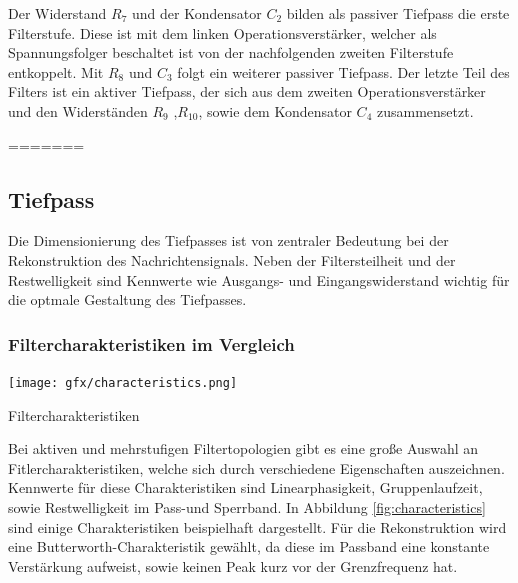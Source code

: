 \noindent
Der Widerstand $R_7$ und der Kondensator $C_2$ bilden als passiver Tiefpass die erste Filterstufe. Diese ist mit dem linken Operationsverstärker, welcher als Spannungsfolger beschaltet ist von der nachfolgenden zweiten Filterstufe entkoppelt. Mit $R_8$ und $C_3$ folgt ein weiterer passiver Tiefpass. Der letzte Teil des Filters ist ein aktiver Tiefpass, der sich aus dem zweiten Operationsverstärker und den Widerständen $R_9$ ,$R_{10}$, sowie dem Kondensator $C_4$ zusammensetzt.








=======
\newpage
\subsection{Tiefpass}
Die Dimensionierung des Tiefpasses ist von zentraler Bedeutung bei der Rekonstruktion des Nachrichtensignals. Neben der Filtersteilheit und der Restwelligkeit sind Kennwerte wie Ausgangs- und Eingangswiderstand wichtig für die optmale Gestaltung des Tiefpasses.
\subsubsection{Filtercharakteristiken im Vergleich} 
\begin{floatingfigure}[r]{7cm}
	\texttt{[image: gfx/characteristics.png]}
	\caption{Filtercharakteristiken}
\label{fig:characteristics}
\end{floatingfigure}
\noindent
Bei aktiven und mehrstufigen Filtertopologien gibt es eine große Auswahl an Fitlercharakteristiken, welche sich durch verschiedene Eigenschaften auszeichnen. Kennwerte für diese Charakteristiken sind Linearphasigkeit, Gruppenlaufzeit, sowie Restwelligkeit im Pass-und Sperrband. In Abbildung \ref{fig:characteristics} sind einige Charakteristiken beispielhaft dargestellt. Für die Rekonstruktion wird eine Butterworth-Charakteristik gewählt, da diese im Passband eine konstante Verstärkung aufweist, sowie keinen Peak kurz vor der Grenzfrequenz hat.\\

